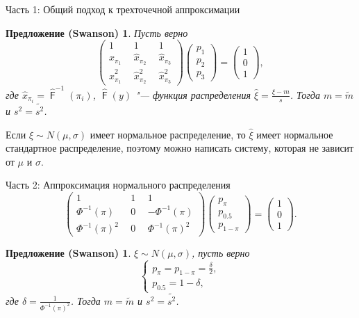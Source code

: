 \documentclass[ucs, notheorems, handout]{beamer}
\newtheorem{proposition}[theorem]{Предложение (Swanson)}
\DeclareMathOperator{\F}{\mathsf{F}}
\begin{document}
\begin{frame}{Часть 1: Общий подход к трехточечной аппроксимации}
	\begin{proposition}\label{pr1}
		Пусть верно 
		\begin{equation*}
			\begin{pmatrix} 
				1&1&1\\ 
				\hat{x}_{\pi_{1}}~~ &  \hat{x}_{\pi_{2}}~~  & \hat{x}_{\pi_{3}} \\ 
				\hat{x}_{\pi_{1}}^{2}~~&\hat{x}_{\pi_{2}}^{2}~~  &\hat{x}_{\pi_{3}}^{2}
			\end{pmatrix}
			\begin{pmatrix}p_{1}\\p_{2}\\ p_{3}\end{pmatrix}= \begin{pmatrix}1\\0\\1 \end{pmatrix},\label{4}
		\end{equation*}
	где $\hat{x}_{\pi_{i}} = \hat{\F}^{-1}(\pi_{i})$, $\hat{\F}(y)$ "--- функция распределения $\displaystyle{\hat{\xi} = \frac{\xi-m}{s}}$. Тогда $m=\tilde{m}$ и $s^{2} = \tilde{s^{2}}$.
	\end{proposition}
	
	Если $\xi\sim N(\mu, \sigma) $ имеет нормальное распределение, то
	$\hat{\xi}$ имеет нормальное стандартное распределение, поэтому можно написать систему, которая не зависит от $\mu$ и $\sigma$.
\end{frame}


\begin{frame}{Часть 2: Аппроксимация нормального распределения}
	\begin{equation*}
		\begin{pmatrix} 1&1&1\\ 
			\Phi^{-1}(\pi)~~ &  0~~  & -\Phi ^{-1}(\pi) \\ 
			\Phi ^{-1}(\pi)^{2}~~& 0~~  &\Phi ^{-1}(\pi)^{2}
		\end{pmatrix} 
		\begin{pmatrix}p_{\pi}\\p_{0.5}\\ p_{1-\pi}\end{pmatrix}= \begin{pmatrix}1\\0\\1\end{pmatrix}.
	\end{equation*}
	
	\begin{proposition}\label{pr7}
		$\xi\sim N(\mu, \sigma)$, пусть верно 
		\begin{equation*}
			\begin{cases}
				p_{\pi} = p_{1-\pi}=\displaystyle{\frac{\delta}{2}},\\ 
				p_{0.5}=1-\delta,
			\end{cases}\label{7}
		\end{equation*}
		где $\delta  = \displaystyle{\frac{1}{\Phi ^{-1}(\pi)^{2}}}$. Тогда $m=\tilde{m}$ и $s^{2} = \tilde{s^{2}}$.
	\end{proposition}
\end{frame}
\end{document}
